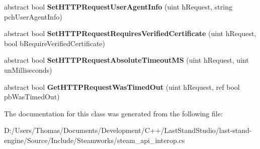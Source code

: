\begin{DoxyCompactItemize}
\item 
\hypertarget{classValve_1_1Steamworks_1_1ISteamHTTP_af4d1e0c5b5a9ebe1bfcf67687a0a8fb2}{}abstract bool {\bfseries Set\+H\+T\+T\+P\+Request\+User\+Agent\+Info} (uint h\+Request, string pch\+User\+Agent\+Info)\label{classValve_1_1Steamworks_1_1ISteamHTTP_af4d1e0c5b5a9ebe1bfcf67687a0a8fb2}

\item 
\hypertarget{classValve_1_1Steamworks_1_1ISteamHTTP_a86be9aa92c1c154b8ad8060a2ef18e74}{}abstract bool {\bfseries Set\+H\+T\+T\+P\+Request\+Requires\+Verified\+Certificate} (uint h\+Request, bool b\+Require\+Verified\+Certificate)\label{classValve_1_1Steamworks_1_1ISteamHTTP_a86be9aa92c1c154b8ad8060a2ef18e74}

\item 
\hypertarget{classValve_1_1Steamworks_1_1ISteamHTTP_aa9a51b12b02d224c5bcbd09754f8801a}{}abstract bool {\bfseries Set\+H\+T\+T\+P\+Request\+Absolute\+Timeout\+M\+S} (uint h\+Request, uint un\+Milliseconds)\label{classValve_1_1Steamworks_1_1ISteamHTTP_aa9a51b12b02d224c5bcbd09754f8801a}

\item 
\hypertarget{classValve_1_1Steamworks_1_1ISteamHTTP_a38784cab3c8be214ee6e835fea17c3f5}{}abstract bool {\bfseries Get\+H\+T\+T\+P\+Request\+Was\+Timed\+Out} (uint h\+Request, ref bool pb\+Was\+Timed\+Out)\label{classValve_1_1Steamworks_1_1ISteamHTTP_a38784cab3c8be214ee6e835fea17c3f5}

\end{DoxyCompactItemize}


The documentation for this class was generated from the following file\+:\begin{DoxyCompactItemize}
\item 
D\+:/\+Users/\+Thomas/\+Documents/\+Development/\+C++/\+Last\+Stand\+Studio/last-\/stand-\/engine/\+Source/\+Include/\+Steamworks/steam\+\_\+api\+\_\+interop.\+cs\end{DoxyCompactItemize}
